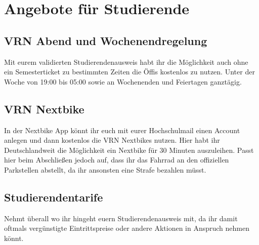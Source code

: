 \chapter{Angebote für Studierende}

\section{VRN Abend und Wochenendregelung}
Mit eurem validierten Studierendenausweis habt ihr die Möglichkeit auch ohne ein Semesterticket 
zu bestimmten Zeiten die Öffis kostenlos zu nutzen. 
Unter der Woche von 19:00 bis 05:00 sowie an Wochenenden und Feiertagen ganztägig.

\section{VRN Nextbike}
In der Nextbike App könnt ihr euch mit eurer Hochschulmail einen Account anlegen und dann 
kostenlos die VRN Nextbikes nutzen. Hier habt ihr Deutschlandweit die Möglichkeit ein Nextbike 
für 30 Minuten auszuleihen. Passt hier beim Abschließen jedoch auf, dass ihr das Fahrrad an den
offiziellen Parkstellen abstellt, da ihr ansonsten eine Strafe bezahlen müsst. 

\section{Studierendentarife}
Nehmt überall wo ihr hingeht euern Studierendenausweis mit, da ihr damit oftmals 
vergünstigte Eintrittspreise oder andere Aktionen in Anspruch nehmen könnt.